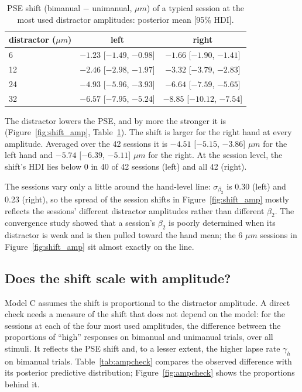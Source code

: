 \documentclass[11pt]{article}
\begin{document}
\begin{table}[H]
\centering
\caption{PSE shift (bimanual $-$ unimanual, $\mu m$) of a typical session at the most
used distractor amplitudes: posterior mean [95\% HDI].}
\label{tab:shift}
\begin{tabular}{lcc}
\toprule
distractor ($\mu m$) & left & right \\
\midrule
6  & $-1.23$ [$-1.49$, $-0.98$] & $-1.66$ [$-1.90$, $-1.41$] \\
12 & $-2.46$ [$-2.98$, $-1.97$] & $-3.32$ [$-3.79$, $-2.83$] \\
24 & $-4.93$ [$-5.96$, $-3.93$] & $-6.64$ [$-7.59$, $-5.65$] \\
32 & $-6.57$ [$-7.95$, $-5.24$] & $-8.85$ [$-10.12$, $-7.54$] \\
\bottomrule
\end{tabular}
\end{table}

The distractor lowers the PSE, and by more the stronger it is
(Figure~\ref{fig:shift_amp}, Table~\ref{tab:shift}). The shift is larger for the right
hand at every amplitude. Averaged over the 42 sessions it is $-4.51$ [$-5.15$, $-3.86$]
$\mu m$ for the left hand and $-5.74$ [$-6.39$, $-5.11$] $\mu m$ for the right. At the
session level, the shift's HDI lies below 0 in 40 of 42 sessions (left) and all 42
(right).

The sessions vary only a little around the hand-level line: $\sigma_{\beta_2}$ is 0.30
(left) and 0.23 (right), so the spread of the session shifts in
Figure~\ref{fig:shift_amp} mostly reflects the sessions' different distractor
amplitudes rather than different $\beta_2$. The convergence study showed that a session's $\beta_2$ is
poorly determined when its distractor is weak and is then pulled toward the hand
mean; the 6 $\mu m$ sessions in Figure~\ref{fig:shift_amp} sit almost exactly on the
line.

\subsection{Does the shift scale with amplitude?}
\label{sec:ampcheck}

Model C assumes the shift is proportional to the distractor amplitude. A direct check
needs a measure of the shift that does not depend on the model: for the sessions at
each of the four most used amplitudes, the difference between the proportions of
``high'' responses on bimanual and unimanual trials, over all stimuli. It reflects the
PSE shift and, to a lesser extent, the higher lapse rate $\gamma_h$ on bimanual trials.
Table~\ref{tab:ampcheck} compares the observed difference with its posterior predictive
distribution; Figure~\ref{fig:ampcheck} shows the proportions behind it.
\end{document}
